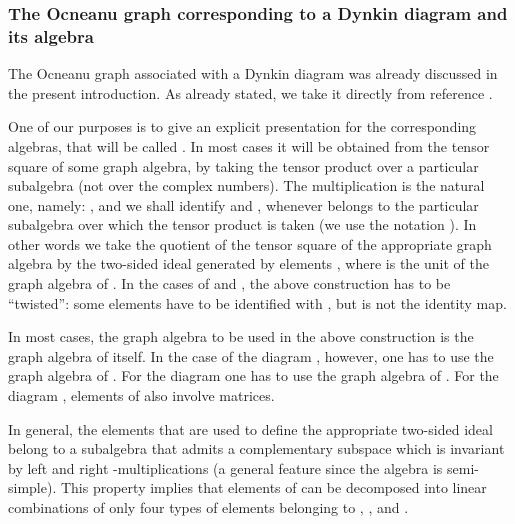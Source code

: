 \documentclass[a4paper,11pt]{article}
\def \otimesdot {\stackrel{\cdot}{\otimes}}
\begin{document}
\subsubsection{The Ocneanu graph corresponding to a Dynkin diagram and
its algebra}

The Ocneanu graph \coordHE{} associated with a Dynkin diagram \coordHE{} was already
discussed in the present introduction.
As already stated, we take it directly from reference \cite{Ocneanu:paths}.

One of our purposes is to give an explicit presentation for the
corresponding algebras, that will be called
\coordHE{}. In most cases it will be obtained from the tensor square
of some graph algebra, by
taking the tensor product over a particular subalgebra (not over the complex
numbers).
The multiplication is the natural
one, namely: \coordHE{}, and we shall identify \coordHE{} and \coordHE{}, whenever \coordHE{} belongs to
the particular subalgebra over which the tensor product is taken 
(we use the notation \myHighlight{$\otimesdot$}\coordHE{}).
In other words we take the quotient of the tensor square of the
appropriate graph algebra by the two-sided ideal generated by
elements \coordHE{}, where \coordHE{} is the unit of the
graph algebra of \coordHE{}. In the cases of \coordHE{} and \coordHE{}, the above
construction has to be ``twisted'': some elements \coordHE{}
have to be identified with \coordHE{}, but \myHighlight{$\rho$}\coordHE{} is not
the identity map.

In most cases, the graph algebra to be used
in the above construction is the graph algebra of  \coordHE{} itself.
In the case of
the diagram \coordHE{}, however,
one has to use the graph algebra of \coordHE{}.
For the diagram \coordHE{} one has to use the graph algebra of
\coordHE{}. For the diagram \coordHE{}, elements of \coordHE{}
also involve  \coordHE{} matrices.


In general, the elements \coordHE{} that are used to define the appropriate
two-sided ideal belong to a subalgebra \coordHE{} that
admits a complementary subspace
\coordHE{} which is invariant by left and right \coordHE{}-multiplications (a 
general feature since the algebra \coordHE{} is semi-simple).
This property implies that elements
of \coordHE{} can be decomposed into linear combinations of
only four types of elements belonging to \myHighlight{$0\otimesdot U$}\coordHE{}, \myHighlight{$0\otimesdot
P$}\coordHE{}, \myHighlight{$P\otimesdot 0$}\coordHE{} and \myHighlight{$P \otimesdot P$}\coordHE{}.
\end{document}
